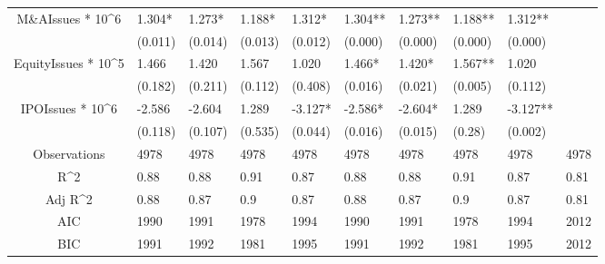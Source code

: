 \documentclass{article}
\begin{document}
\begin{table}[H]
\begin{tabular}{|clllllllll|}
  M\&AIssues * 10^6 & 1.304* & 1.273* & 1.188* & 1.312* & 1.304** & 1.273** & 1.188** & 1.312** &  \\ 
   & (0.011) & (0.014) & (0.013) & (0.012) & (0.000) & (0.000) & (0.000) & (0.000) &  \\ 
  EquityIssues * 10^5 & 1.466 & 1.420 & 1.567 & 1.020 & 1.466* & 1.420* & 1.567** & 1.020 &  \\ 
   & (0.182) & (0.211) & (0.112) & (0.408) & (0.016) & (0.021) & (0.005) & (0.112) &  \\ 
  IPOIssues * 10^6 & -2.586 & -2.604 & 1.289 & -3.127* & -2.586* & -2.604* & 1.289 & -3.127** &  \\ 
   & (0.118) & (0.107) & (0.535) & (0.044) & (0.016) & (0.015) & (0.28) & (0.002) &  \\ 
  \hline 
 Observations & 4978 & 4978 & 4978 & 4978 & 4978 & 4978 & 4978 & 4978 & 4978 \\ 
  R^2 & 0.88 & 0.88 & 0.91 & 0.87 & 0.88 & 0.88 & 0.91 & 0.87 & 0.81 \\ 
  Adj R^2 & 0.88 & 0.87 & 0.9 & 0.87 & 0.88 & 0.87 & 0.9 & 0.87 & 0.81 \\ 
  AIC & 1990 & 1991 & 1978 & 1994 & 1990 & 1991 & 1978 & 1994 & 2012 \\ 
  BIC & 1991 & 1992 & 1981 & 1995 & 1991 & 1992 & 1981 & 1995 & 2012 \\ 
   \hline
\end{tabular}
 
\end{table}
\end{document}
